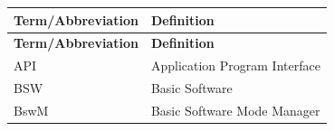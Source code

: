 \begin{longtable}{|l|l|}
\hline
\begin{minipage}{0.31\linewidth}\raggedright\vspace{.75ex}\textbf{Term/Abbreviation}\vspace{.75ex}\end{minipage} & \begin{minipage}{0.63\linewidth}\raggedright\vspace{.75ex}\textbf{Definition}\vspace{.75ex}\end{minipage}\\
\hline\hline
\endfirsthead
\hline
\begin{minipage}{0.31\linewidth}\raggedright\vspace{.75ex}\textbf{Term/Abbreviation}\vspace{.75ex}\end{minipage} & \begin{minipage}{0.63\linewidth}\raggedright\vspace{.75ex}\textbf{Definition}\vspace{.75ex}\end{minipage}\\
\hline\hline
\endhead
\hline
\endfoot
\hline
\endlastfoot
\begin{minipage}{0.31\linewidth}\raggedright\vspace{.75ex}API\vspace{.75ex}\end{minipage} & \begin{minipage}{0.63\linewidth}\raggedright\vspace{.75ex}Application Program Interface\vspace{.75ex}\end{minipage}\\\hline
\begin{minipage}{0.31\linewidth}\raggedright\vspace{.75ex}BSW\vspace{.75ex}\end{minipage} & \begin{minipage}{0.63\linewidth}\raggedright\vspace{.75ex}Basic Software\vspace{.75ex}\end{minipage}\\\hline
\begin{minipage}{0.31\linewidth}\raggedright\vspace{.75ex}BswM\vspace{.75ex}\end{minipage} & \begin{minipage}{0.63\linewidth}\raggedright\vspace{.75ex}Basic Software Mode Manager\vspace{.75ex}\end{minipage}\\\hline

\end{longtable}
